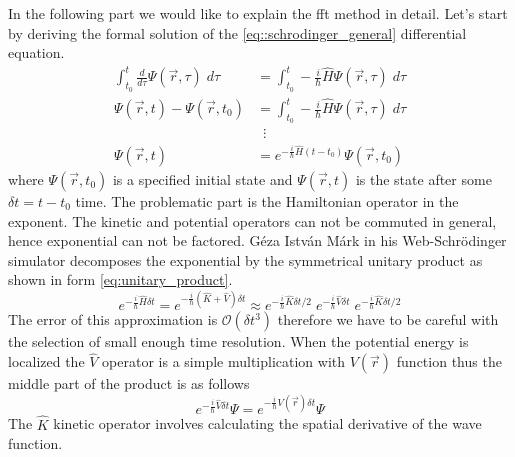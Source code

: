 In the following part we would like to explain the \acrshort{fft} method in detail.
Let's start by deriving the formal solution of the \ref{eq::schrodinger_general} differential equation.
\begin{equation}
	\label{eq:formal_solution}
	\begin{split}
		\int_{t_0}^t \frac{d}{d\tau}\Psi(\vec{r}, \tau) \; d\tau &= \int_{t_0}^t -\frac{i}{\hbar}\hat{H}\Psi(\vec{r}, \tau)\; d\tau\\
		\Psi(\vec{r}, t) - \Psi(\vec{r}, t_0) &= \int_{t_0}^t -\frac{i}{\hbar}\hat{H}\Psi(\vec{r}, \tau)\; d\tau\\
		&\;\:\vdots\\
		\Psi(\vec{r}, t) &= e^{-\frac{i}{\hbar}\hat{H}(t - t_0)} \Psi(\vec{r}, t_0)
	\end{split}
\end{equation}
where $\Psi(\vec{r}, t_0)$ is a specified initial state and $\Psi(\vec{r}, t)$ is the state after some $\delta t = t - t_0$ time.
The problematic part is the Hamiltonian operator in the exponent.
The kinetic and potential operators can not be commuted in general, hence exponential can not be factored.
Géza István Márk in his Web-Schrödinger simulator \cite{mark2020webschrodinger} decomposes the exponential by the symmetrical unitary product as shown in form \ref{eq:unitary_product}.
\begin{equation}
	\label{eq:unitary_product}
	e^{-\frac{i}{\hbar}\hat{H}\delta t} = e^{-\frac{i}{\hbar}(\hat{K} + \hat{V})\delta t} \approx e^{-\frac{i}{\hbar}\hat{K}\delta t / 2}\; e^{-\frac{i}{\hbar}\hat{V}\delta t}\; e^{-\frac{i}{\hbar}\hat{K}\delta t / 2}
\end{equation}
The error of this approximation is $\mathcal{O}(\delta t^3)$ therefore we have to be careful with the selection of small enough time resolution.
When the potential energy is localized the $\hat{V}$ operator is a simple multiplication with $V(\vec{r})$ function thus the middle part of the product is as follows
\begin{equation}
	\label{eq:potential_prop}
	e^{-\frac{i}{\hbar}\hat{V}\delta t} \Psi = e^{-\frac{i}{\hbar}V(\vec{r})\delta t} \Psi
\end{equation}
The $\hat{K}$ kinetic operator involves calculating the spatial derivative of the wave function.

